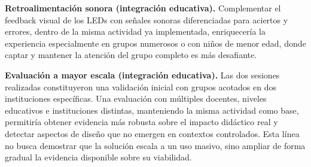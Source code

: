 \documentclass{prgrado}
\begin{document}
\textbf{Retroalimentación sonora (integración educativa).} Complementar el feedback visual de los LEDs con señales sonoras diferenciadas para aciertos y errores, dentro de la misma actividad ya implementada, enriquecería la experiencia especialmente en grupos numerosos o con niños de menor edad, donde captar y mantener la atención del grupo completo es más desafiante.



\textbf{Evaluación a mayor escala (integración educativa).} Las dos sesiones realizadas constituyeron una validación inicial con grupos acotados en dos instituciones específicas. Una evaluación con múltiples docentes, niveles educativos e instituciones distintas, manteniendo la misma actividad como base, permitiría obtener evidencia más robusta sobre el impacto didáctico real y detectar aspectos de diseño que no emergen en contextos controlados. Esta línea no busca demostrar que la solución escala a un uso masivo, sino ampliar de forma gradual la evidencia disponible sobre su viabilidad.



{ %

\backmatter %


\newpage



} %


\end{document}
